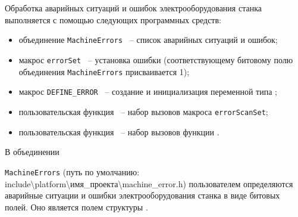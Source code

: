 \begin{comment}

\quad case default: \{ &   \\
\qquad mt.OUT.pumpA = 0; & \textcolor{exComm}{//Насос А выключить}  \\
\qquad mt.OUT.pumpB = 0; & \textcolor{exComm}{//Насос В выключить}  \\
\qquad break;&   \\
\quad \} &   \\

\} & \\
\end{tabular}

\end{pExample} 
\end{comment}

\section{}

Обработка аварийных ситуаций и ошибок электрооборудования станка выполняется с помощью следующих программных средств:\killoverfullbefore
\begin{itemize}
\item объединение \texttt{MachineErrors} ~--  список аварийных ситуаций и ошибок;
\item макрос \texttt{errorSet} ~-- установка ошибки (соответствующему битовому полю объединения \texttt{MachineErrors} присваивается 1); \killoverfullbefore
\item макрос \texttt{DEFINE\_ERROR} ~--  создание и инициализация переменной типа ; \killoverfullbefore
\item пользовательская функция  ~-- набор вызовов макроса \texttt{errorScanSet}; \killoverfullbefore
\item пользовательская функция  ~-- набор вызовов функции . \killoverfullbefore \BL
\end{itemize}

\hypertarget{Machine_Errors}{В объединении} \texttt{MachineErrors} (путь по умолчанию: include\textbackslash platform\textbackslash имя\_проекта\textbackslash machine\_error.h) пользователем определяются аварийные ситуации и ошибки электрооборудования станка в виде битовых полей. Оно является полем структуры . \killoverfullbefore

